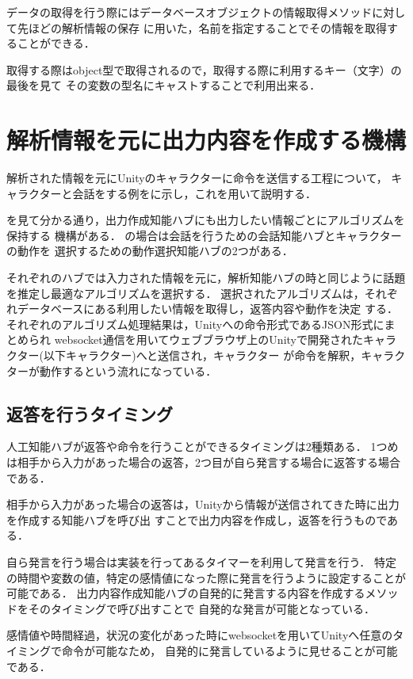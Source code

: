 データの取得を行う際にはデータベースオブジェクトの情報取得メソッドに対して先ほどの解析情報の保存
に用いた，名前を指定することでその情報を取得することができる．

取得する際はobject型で取得されるので，取得する際に利用するキー（文字）の最後を見て
その変数の型名にキャストすることで利用出来る．


\section{解析情報を元に出力内容を作成する機構}
解析された情報を元にUnityのキャラクターに命令を送信する工程について，
キャラクターと会話をする例をに示し，これを用いて説明する．


を見て分かる通り，出力作成知能ハブにも出力したい情報ごとにアルゴリズムを保持する
機構がある．
の場合は会話を行うための会話知能ハブとキャラクターの動作を
選択するための動作選択知能ハブの2つがある．

それぞれのハブでは入力された情報を元に，解析知能ハブの時と同じように話題を推定し最適なアルゴリズムを選択する．
選択されたアルゴリズムは，それぞれデータベースにある利用したい情報を取得し，返答内容や動作を決定
する．
それぞれのアルゴリズム処理結果は，Unityへの命令形式であるJSON形式にまとめられ
websocket通信を用いてウェブブラウザ上のUnityで開発されたキャラクター(以下キャラクター)へと送信され，キャラクター
が命令を解釈，キャラクターが動作するという流れになっている．

\subsection{返答を行うタイミング}
人工知能ハブが返答や命令を行うことができるタイミングは2種類ある．
1つめは相手から入力があった場合の返答，2つ目が自ら発言する場合に返答する場合である．

相手から入力があった場合の返答は，Unityから情報が送信されてきた時に出力を作成する知能ハブを呼び出
すことで出力内容を作成し，返答を行うものである．

自ら発言を行う場合は実装を行ってあるタイマーを利用して発言を行う．
特定の時間や変数の値，特定の感情値になった際に発言を行うように設定することが可能である．
出力内容作成知能ハブの自発的に発言する内容を作成するメソッドをそのタイミングで呼び出すことで
自発的な発言が可能となっている．

感情値や時間経過，状況の変化があった時にwebsocketを用いてUnityへ任意のタイミングで命令が可能なため，
自発的に発言しているように見せることが可能である．

